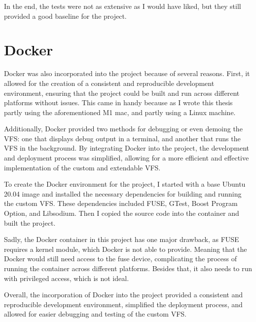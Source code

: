 In the end, the tests were not as extensive as I would have liked, but they still provided a good baseline for the project.


\section{Docker}\label{sec:docker}

Docker\cite{docker} was also incorporated into the project because of several reasons.
First, it allowed for the creation of a consistent and reproducible development environment, ensuring that the project could be built and run across different platforms without issues.
This came in handy because as I wrote this thesis partly using the aforementioned M1 mac, and partly using a Linux machine.

Additionally, Docker provided two methods for debugging or even demoing the VFS: one that displays debug output in a terminal, and another that runs the VFS in the background.
By integrating Docker into the project, the development and deployment process was simplified, allowing for a more efficient and effective implementation of the custom and extendable VFS\@.

To create the Docker environment for the project, I started with a base Ubuntu 20.04 image and installed the necessary dependencies for building and running the custom VFS\@.
These dependencies included FUSE, GTest, Boost Program Option, and Libsodium.
Then I copied the source code into the container and built the project.

Sadly, the Docker container in this project has one major drawback, as FUSE requires a kernel module, which Docker is not able to provide.
Meaning that the Docker would still need access to the fuse device, complicating the process of running the container across different platforms.
Besides that, it also needs to run with privileged access, which is not ideal.

Overall, the incorporation of Docker into the project provided a consistent and reproducible development environment, simplified the deployment process, and allowed for easier debugging and testing of the custom VFS\@.
